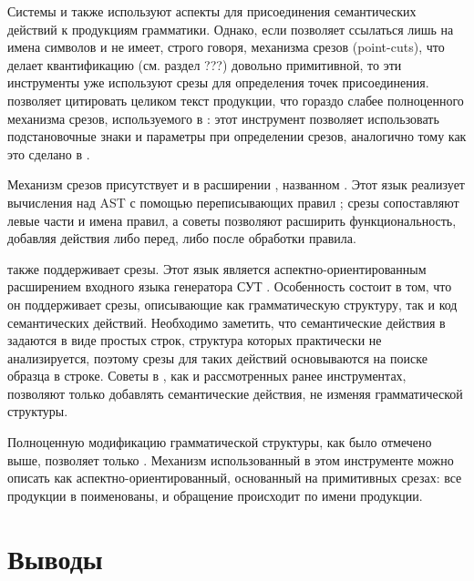 Системы  \cite{???} и  \cite{???} также используют аспекты для присоединения семантических действий к продукциям грамматики. Однако, если  позволяет ссылаться лишь на имена символов и не имеет, строго говоря, механизма срезов (point-cuts), что делает квантификацию (см. раздел ???) довольно примитивной, то эти инструменты уже используют срезы для определения точек присоединения.  позволяет цитировать целиком текст продукции, что гораздо слабее полноценного механизма срезов, используемого в : этот инструмент позволяет использовать подстановочные знаки и параметры при определении срезов, аналогично тому как это сделано в .

Механизм срезов присутствует и в расширении , названном  \cite{???}. Этот язык реализует вычисления над AST с помощью переписывающих правил \cite{???}; срезы сопоставляют левые части и имена правил, а советы позволяют расширить функциональность, добавляя действия либо перед, либо после обработки правила.

 \cite{???} также поддерживает срезы. Этот язык является аспектно-ориентированным расширением входного языка генератора СУТ  \cite{???}. Особенность  состоит в том, что он поддерживает срезы, описывающие как грамматическую структуру, так и код семантических действий. Необходимо заметить, что семантические действия в  задаются в виде простых строк, структура которых практически не анализируется, поэтому срезы для таких действий основываются на поиске образца в строке. Советы в , как и рассмотренных ранее инструментах, позволяют только добавлять семантические действия, не изменяя грамматической структуры.

Полноценную модификацию грамматической структуры, как было отмечено выше, позволяет только . Механизм использованный в этом инструменте можно описать как аспектно-ориентированный, основанный на примитивных срезах: все продукции в  поименованы, и обращение происходит по имени продукции.



\section{Выводы}

